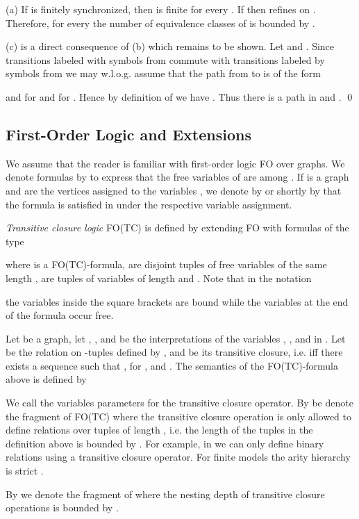 \documentclass{LMCS}
\begin{document}
\proof
(a) If  is finitely synchronized, then  is finite for every .
    If  then  refines  on . Therefore, 
    for every  the number of equivalence classes of  is bounded by
    .

(c) is a direct consequence of (b) which remains to be 
    shown. Let  and .
    Since transitions labeled with  symbols from  
    commute with transitions labeled by symbols from  
    we may w.l.o.g. assume that the path from  to  is of the form
    
    and  for  and  for .
    Hence by definition of  we have . Thus
    there is a path  in 
    and .
\qed
    

\subsection{First-Order Logic and Extensions}

We assume that the reader is familiar with first-order logic FO 
over graphs. We denote formulas by  to express that 
the free variables of  are among . If  is a graph and
 are the vertices assigned to the variables , we
denote by  or shortly by
 that the formula  is satisfied in 
under the respective variable assignment.

\emph{Transitive closure logic} FO(TC) is defined by extending 
FO with formulas of the type 

where  is a FO(TC)-formula,  are disjoint 
tuples of free variables of the same length ,   are tuples of 
variables of length  and . Note that in the notation 

the variables inside the square brackets are bound while the variables at the end of the formula
occur free.

Let  be a graph, let , , and  be the interpretations of the variables 
, , and  in . Let  be the relation on -tuples defined by 
,
and  be its transitive closure, i.e. 
iff there exists a sequence  such that
,  for , and
. The semantics of the FO(TC)-formula above is defined by


We call the variables  parameters for the transitive closure operator.
By  be denote the fragment of FO(TC) where the 
transitive closure operation is only allowed to define relations over tuples of 
length , i.e. the length of the tuples  in the
definition above is bounded by . For example, in 
we can only define binary relations using a transitive closure operator.
For finite models the arity hierarchy  is 
strict \cite{gro96}.

By  we denote the 
fragment of  where the nesting depth of transitive closure 
operations is bounded by . 
\end{document}
